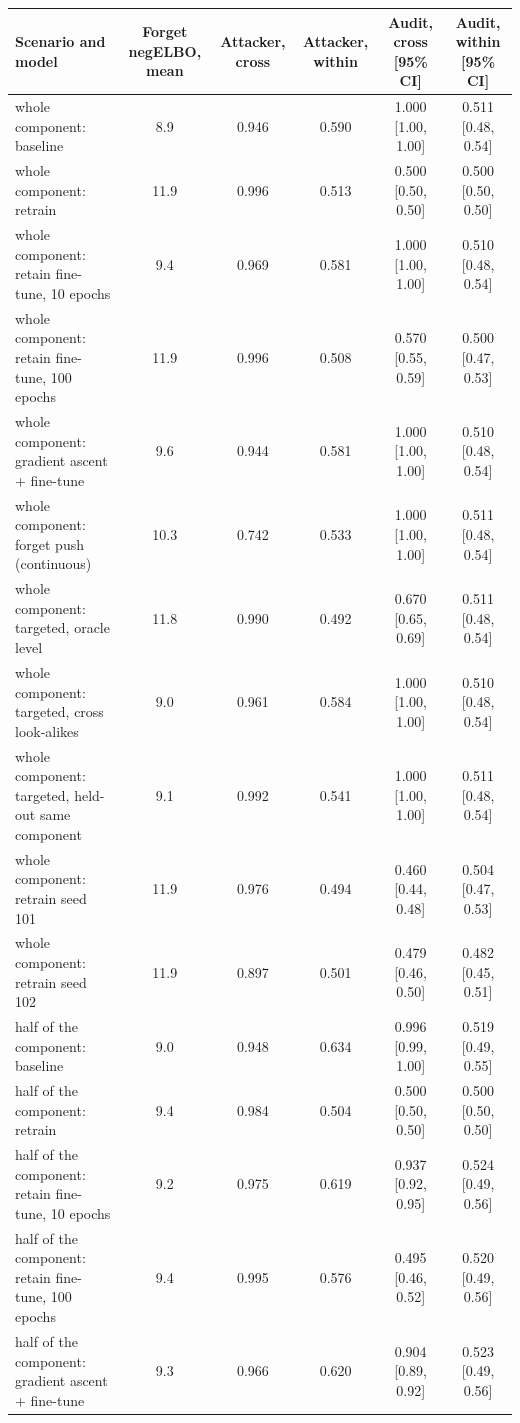 \begin{tabular}{lccccc}
\toprule
Scenario and model & Forget negELBO, mean & Attacker, cross & Attacker, within & Audit, cross [95\% CI] & Audit, within [95\% CI] \\
\midrule
whole component: baseline & 8.9 & 0.946 & 0.590 & 1.000 [1.00, 1.00] & 0.511 [0.48, 0.54] \\
whole component: retrain & 11.9 & 0.996 & 0.513 & 0.500 [0.50, 0.50] & 0.500 [0.50, 0.50] \\
whole component: retain fine-tune, 10 epochs & 9.4 & 0.969 & 0.581 & 1.000 [1.00, 1.00] & 0.510 [0.48, 0.54] \\
whole component: retain fine-tune, 100 epochs & 11.9 & 0.996 & 0.508 & 0.570 [0.55, 0.59] & 0.500 [0.47, 0.53] \\
whole component: gradient ascent + fine-tune & 9.6 & 0.944 & 0.581 & 1.000 [1.00, 1.00] & 0.510 [0.48, 0.54] \\
whole component: forget push (continuous) & 10.3 & 0.742 & 0.533 & 1.000 [1.00, 1.00] & 0.511 [0.48, 0.54] \\
whole component: targeted, oracle level & 11.8 & 0.990 & 0.492 & 0.670 [0.65, 0.69] & 0.511 [0.48, 0.54] \\
whole component: targeted, cross look-alikes & 9.0 & 0.961 & 0.584 & 1.000 [1.00, 1.00] & 0.510 [0.48, 0.54] \\
whole component: targeted, held-out same component & 9.1 & 0.992 & 0.541 & 1.000 [1.00, 1.00] & 0.511 [0.48, 0.54] \\
whole component: retrain seed 101 & 11.9 & 0.976 & 0.494 & 0.460 [0.44, 0.48] & 0.504 [0.47, 0.53] \\
whole component: retrain seed 102 & 11.9 & 0.897 & 0.501 & 0.479 [0.46, 0.50] & 0.482 [0.45, 0.51] \\
\midrule
half of the component: baseline & 9.0 & 0.948 & 0.634 & 0.996 [0.99, 1.00] & 0.519 [0.49, 0.55] \\
half of the component: retrain & 9.4 & 0.984 & 0.504 & 0.500 [0.50, 0.50] & 0.500 [0.50, 0.50] \\
half of the component: retain fine-tune, 10 epochs & 9.2 & 0.975 & 0.619 & 0.937 [0.92, 0.95] & 0.524 [0.49, 0.56] \\
half of the component: retain fine-tune, 100 epochs & 9.4 & 0.995 & 0.576 & 0.495 [0.46, 0.52] & 0.520 [0.49, 0.56] \\
half of the component: gradient ascent + fine-tune & 9.3 & 0.966 & 0.620 & 0.904 [0.89, 0.92] & 0.523 [0.49, 0.56] \\

\end{tabular}
